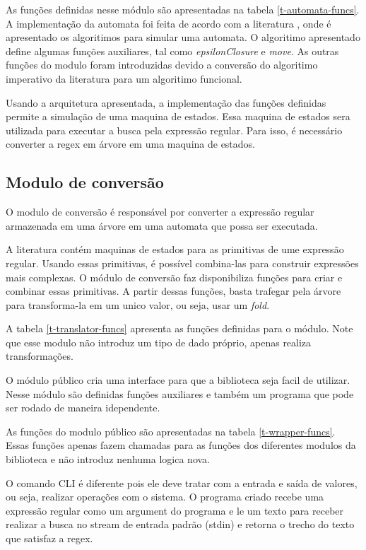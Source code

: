 As funções definidas nesse módulo são apresentadas na tabela \ref{t-automata-funcs}.
A implementação da automata foi feita de acordo com a literatura \cite{dragon-book}, onde é apresentado os algoritimos para simular uma automata.
O algoritimo apresentado define algumas funções auxiliares, tal como \emph{epsilonClosure} e \emph{move}.
As outras funções do modulo foram introduzidas devido a conversão do algoritimo imperativo da literatura para um algoritimo funcional.

Usando a arquitetura apresentada, a implementação das funções definidas permite a simulação de uma maquina de estados.
Essa maquina de estados sera utilizada para executar a busca pela expressão regular.
Para isso, é necessário converter a regex em árvore em uma maquina de estados.

\subsection{Modulo de conversão}

O modulo de conversão é responsável por converter a expressão regular armazenada em uma árvore em uma automata que possa ser executada.

A literatura contém maquinas de estados para as primitivas de ume expressão regular.
Usando essas primitivas, é possível combina-las para construir expressões mais complexas.
O módulo de conversão faz disponibiliza funções para criar e combinar essas primitivas.
A partir dessas funções, basta trafegar pela árvore para transforma-la em um unico valor, ou seja, usar um \emph{fold}.

A tabela \ref{t-translator-funcs} apresenta as funções definidas para o módulo.
Note que esse modulo não introduz um tipo de dado próprio, apenas realiza transformações.

O módulo público cria uma interface para que a biblioteca seja facil de utilizar.
Nesse módulo são definidas funções auxiliares e também um programa que pode ser rodado de maneira idependente.

As funções do modulo público são apresentadas na tabela \ref{t-wrapper-funcs}.
Essas funções apenas fazem chamadas para as funções dos diferentes modulos da biblioteca e não introduz nenhuma logica nova.

O comando CLI é diferente pois ele deve tratar com a entrada e saída de valores, ou seja, realizar operações com o sistema.
O programa criado recebe uma expressão regular como um argument do programa e le um texto para receber realizar a busca no stream de entrada padrão (stdin) e retorna o trecho do texto que satisfaz a regex.

